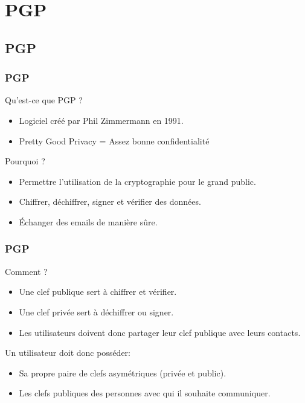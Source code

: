\section{PGP}
\subsection{PGP}
\begin{frame}
    \frametitle{\color{white}PGP}
    \begin{block}{Qu'est-ce que PGP ?}
      \begin{itemize}
       \item Logiciel créé par Phil Zimmermann en 1991.
         \item Pretty Good Privacy = Assez bonne confidentialité
       \end{itemize} 
    \end{block}
    \begin{block}{Pourquoi ?}
      \begin{itemize}
         \item Permettre l'utilisation de la cryptographie pour le grand public.
         \item Chiffrer, déchiffrer, signer et vérifier des données. 
         \item Échanger des emails de manière sûre.
       \end{itemize} 
    \end{block}
\end{frame}
\begin{frame}
    \frametitle{\color{white}PGP}
    \begin{block}{Comment ?}
      \begin{itemize}
	\item Une clef publique sert à chiffrer et vérifier.
	\item Une clef privée sert à déchiffrer ou signer.
	\item Les utilisateurs doivent donc partager leur clef publique avec leurs contacts.
      \end{itemize} 
    \end{block}
    \begin{block}{Un utilisateur doit donc posséder:}
	  \begin{itemize}
	    \item Sa propre paire de clefs asymétriques (privée et public).
	    \item Les clefs publiques des personnes avec qui il souhaite communiquer. 
	  \end{itemize}
    \end{block}    
\end{frame}

